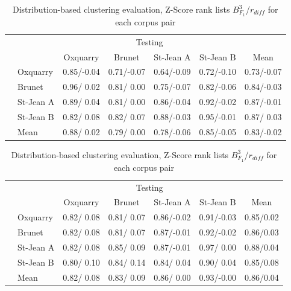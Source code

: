\begin{table}[H]
  \centering
  \caption{Distribution-based clustering evaluation, Z-Score rank lists $B^{3}_{F_1}$/$r_{diff}$ for each corpus pair}
  \label{tab:distribution-based_clustering_zscore}

  \vspace{0.5cm}

  \begin{tabular}{l l| c c c c|c}
    \toprule
    \multicolumn{2}{c}{\multirow{2}{*}{}} & \multicolumn{4}{c}{Testing} \\
    \multicolumn{2}{c}{} & Oxquarry & Brunet & St-Jean A & St-Jean B & Mean \\
    \midrule
    \parbox[t]{2mm}{}
    & Oxquarry  & 0.85/-0.04 & 0.71/-0.07 & 0.64/-0.09 & 0.72/-0.10 & 0.73/-0.07 \\
    & Brunet    & 0.96/ 0.02 & 0.81/ 0.00 & 0.75/-0.07 & 0.82/-0.06 & 0.84/-0.03 \\
    & St-Jean A & 0.89/ 0.04 & 0.81/ 0.00 & 0.86/-0.04 & 0.92/-0.02 & 0.87/-0.01 \\
    & St-Jean B & 0.82/ 0.08 & 0.82/ 0.07 & 0.88/-0.03 & 0.95/-0.01 & 0.87/ 0.03 \\
    \midrule
    & Mean      & 0.88/ 0.02 & 0.79/ 0.00 & 0.78/-0.06 & 0.85/-0.05 & 0.83/-0.02 \\
    \bottomrule
  \end{tabular}

  \vspace{0.5cm}

  \begin{tabular}{l l| c c c c|c}
    \toprule
    \multicolumn{2}{c}{\multirow{2}{*}{}} & \multicolumn{4}{c}{Testing} \\
    \multicolumn{2}{c}{} & Oxquarry & Brunet & St-Jean A & St-Jean B & Mean \\
    \midrule
    \parbox[t]{2mm}{}
    & Oxquarry  & 0.82/ 0.08 & 0.81/ 0.07 & 0.86/-0.02 & 0.91/-0.03 & 0.85/0.02\\
    & Brunet    & 0.82/ 0.08 & 0.81/ 0.07 & 0.87/-0.01 & 0.92/-0.02 & 0.86/0.03\\
    & St-Jean A & 0.82/ 0.08 & 0.85/ 0.09 & 0.87/-0.01 & 0.97/ 0.00 & 0.88/0.04\\
    & St-Jean B & 0.80/ 0.10 & 0.84/ 0.14 & 0.84/ 0.04 & 0.90/ 0.04 & 0.85/0.08\\
    \midrule
    & Mean      & 0.82/ 0.08 & 0.83/ 0.09 & 0.86/ 0.00 & 0.93/-0.00 & 0.86/0.04\\
    \bottomrule
  \end{tabular}

\end{table}


